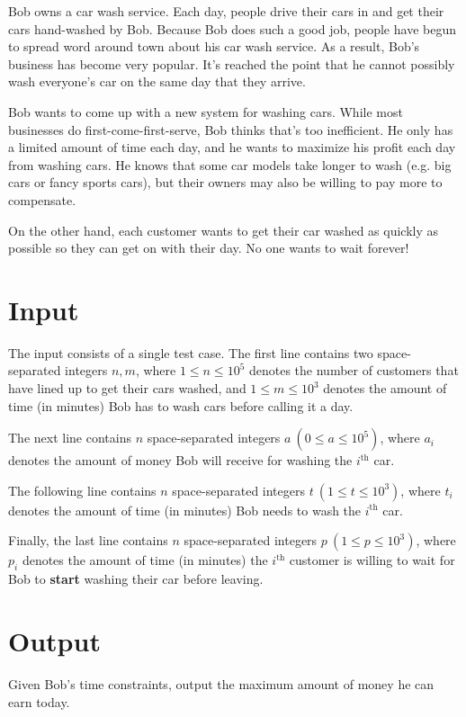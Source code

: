 
Bob owns a car wash service. Each day, people drive their cars in and get their cars hand-washed by Bob. Because Bob does such a good job, people have begun to spread word around town about his car wash service. As a result, Bob's business has become very popular. It's reached the point that he cannot possibly wash everyone's car on the same day that they arrive. 

Bob wants to come up with a new system for washing cars. While most businesses do first-come-first-serve, Bob thinks that's too inefficient. He only has a limited amount of time each day, and he wants to maximize his profit each day from washing cars. He knows that some car models take longer to wash (e.g. big cars or fancy sports cars), but their owners may also be willing to pay more to compensate. 

On the other hand, each customer wants to get their car washed as quickly as possible so they can get on with their day. No one wants to wait forever!

\section*{Input}

The input consists of a single test case. The first line contains two space-separated integers $n, m$, where $1 \leq n \leq 10^5$ denotes the number of customers that have lined up to get their cars washed, and $1 \leq m \leq 10^3$ denotes the amount of time (in minutes) Bob has to wash cars before calling it a day.

The next line contains $n$ space-separated integers $a\ (0 \leq a \leq 10^5)$, where $a_i$ denotes the amount of money Bob will receive for washing the $i^\text{th}$ car.

The following line contains $n$ space-separated integers $t\ (1 \leq t \leq 10^3)$, where $t_i$ denotes the amount of time (in minutes) Bob needs to wash the $i^\text{th}$ car.

Finally, the last line contains $n$ space-separated integers $p\ (1 \leq p \leq 10^3)$, where $p_i$ denotes the amount of time (in minutes) the $i^\text{th}$ customer is willing to wait for Bob to \textbf{start} washing their car before leaving.

\section*{Output}

Given Bob's time constraints, output the maximum amount of money he can earn today. 
